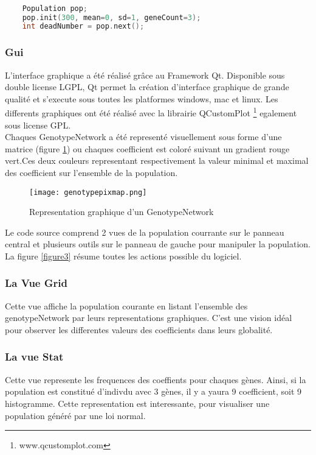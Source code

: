 \documentclass{article}
\begin{document}
	\begin{lstlisting}[language=C++, caption=Generation d'une population et basculement vers la génération suivante, label={code3}]

	Population pop;
	pop.init(300, mean=0, sd=1, geneCount=3); 
	int deadNumber = pop.next();

	\end{lstlisting}

	\subsubsection {Gui}
	L'interface graphique a été réalisé grâce au Framework Qt. Disponible sous double license LGPL, Qt permet la création d'interface graphique de grande qualité et s'execute sous toutes les platformes windows, mac et linux. Les differents graphiques ont été réalisé avec la librairie QCustomPlot \footnote{www.qcustomplot.com} egalement sous license GPL. \\
	Chaques GenotypeNetwork a été representé visuellement sous forme d'une matrice (figure \ref{figure2}) ou chaques coefficient est coloré suivant un gradient rouge vert.Ces deux couleurs representant respectivement la valeur minimal et maximal des coefficient sur l'ensemble de la population.

	\begin{figure}[h]
	\label{figure2}
	\caption[test]{Representation graphique d'un GenotypeNetwork }
	\centering
	\texttt{[image: genotypepixmap.png]}
	\end{figure}


	\clearpage
	Le code source comprend 2 vues de la population courrante sur le panneau central et plusieurs outils sur le panneau de gauche pour manipuler la population. La figure \ref{figure3} résume toutes les actions possible du logiciel.
	\subsubsection {La Vue Grid}
	Cette vue affiche la population courante en listant l'ensemble des genotypeNetwork par leurs representations graphiques. C'est une vision idéal pour observer les differentes valeurs des coefficients dans leurs globalité. 
	\subsubsection { La vue Stat}
	Cette vue represente les frequences des coeffients pour chaques gènes. Ainsi, si la population est constitué d'indivdu avec 3 gènes, il y a yaura 9 coefficient, soit 9 histogramme. Cette representation est interessante, pour visualiser une population généré par une loi normal.
\end{document}
